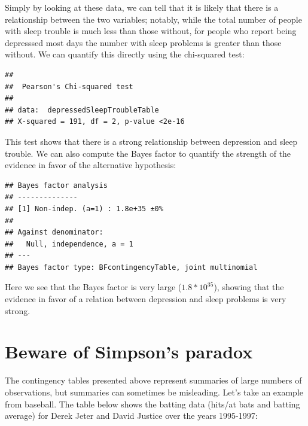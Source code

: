\documentclass[
  12pt,
]{book}
\begin{document}
Simply by looking at these data, we can tell that it is likely that there is a relationship between the two variables; notably, while the total number of people with sleep trouble is much less than those without, for people who report being depresssed most days the number with sleep problems is greater than those without. We can quantify this directly using the chi-squared test:

\begin{verbatim}
## 
##  Pearson's Chi-squared test
## 
## data:  depressedSleepTroubleTable
## X-squared = 191, df = 2, p-value <2e-16
\end{verbatim}

This test shows that there is a strong relationship between depression and sleep trouble. We can also compute the Bayes factor to quantify the strength of the evidence in favor of the alternative hypothesis:

\begin{verbatim}
## Bayes factor analysis
## --------------
## [1] Non-indep. (a=1) : 1.8e+35 ±0%
## 
## Against denominator:
##   Null, independence, a = 1 
## ---
## Bayes factor type: BFcontingencyTable, joint multinomial
\end{verbatim}

Here we see that the Bayes factor is very large (\(1.8 * 10^{35}\)), showing that the evidence in favor of a relation between depression and sleep problems is very strong.

\hypertarget{beware-of-simpsons-paradox}{%
\section{Beware of Simpson's paradox}\label{beware-of-simpsons-paradox}}

The contingency tables presented above represent summaries of large numbers of observations, but summaries can sometimes be misleading. Let's take an example from baseball. The table below shows the batting data (hits/at bats and batting average) for Derek Jeter and David Justice over the years 1995-1997:
\end{document}
